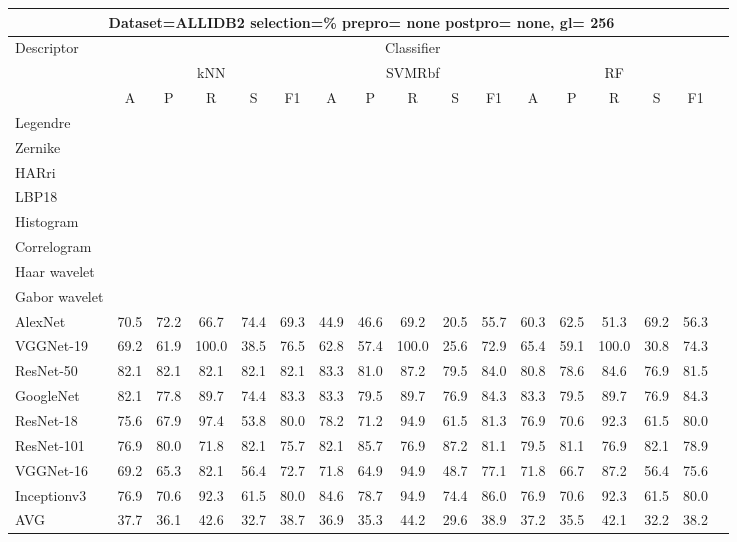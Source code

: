 \documentclass[12pt,italian]{article}
\begin{document}
\begin{tiny}
 \pagebreak 
\begin{longtable}{lcccccccccccccccc}
\toprule
\multicolumn{16}{c}{Dataset=ALLIDB2 selection=\% prepro= none postpro= none, gl= 256} \\ 
\toprule
Descriptor & \multicolumn{15}{c}{Classifier} \\ 
& \multicolumn{5}{c}{kNN} & \multicolumn{5}{c}{SVMRbf} & \multicolumn{5}{c}{RF} \\ 
& A & P & R & S & F1 & A & P & R & S & F1 & A & P & R & S & F1 \\ 
\midrule
Legendre \\ 
Zernike \\ 
HARri \\ 
LBP18 \\ 
Histogram \\ 
Correlogram \\ 
Haar wavelet \\ 
Gabor wavelet \\ 
AlexNet & 70.5 & 72.2 & 66.7 & 74.4 & 69.3 & 44.9 & 46.6 & 69.2 & 20.5 & 55.7 & 60.3 & 62.5 & 51.3 & 69.2 & 56.3 \\ 
VGGNet-19 & 69.2 & 61.9 & 100.0 & 38.5 & 76.5 & 62.8 & 57.4 & 100.0 & 25.6 & 72.9 & 65.4 & 59.1 & 100.0 & 30.8 & 74.3 \\ 
ResNet-50 & 82.1 & 82.1 & 82.1 & 82.1 & 82.1 & 83.3 & 81.0 & 87.2 & 79.5 & 84.0 & 80.8 & 78.6 & 84.6 & 76.9 & 81.5 \\ 
GoogleNet & 82.1 & 77.8 & 89.7 & 74.4 & 83.3 & 83.3 & 79.5 & 89.7 & 76.9 & 84.3 & 83.3 & 79.5 & 89.7 & 76.9 & 84.3 \\ 
ResNet-18 & 75.6 & 67.9 & 97.4 & 53.8 & 80.0 & 78.2 & 71.2 & 94.9 & 61.5 & 81.3 & 76.9 & 70.6 & 92.3 & 61.5 & 80.0 \\ 
ResNet-101 & 76.9 & 80.0 & 71.8 & 82.1 & 75.7 & 82.1 & 85.7 & 76.9 & 87.2 & 81.1 & 79.5 & 81.1 & 76.9 & 82.1 & 78.9 \\ 
VGGNet-16 & 69.2 & 65.3 & 82.1 & 56.4 & 72.7 & 71.8 & 64.9 & 94.9 & 48.7 & 77.1 & 71.8 & 66.7 & 87.2 & 56.4 & 75.6 \\ 
Inceptionv3 & 76.9 & 70.6 & 92.3 & 61.5 & 80.0 & 84.6 & 78.7 & 94.9 & 74.4 & 86.0 & 76.9 & 70.6 & 92.3 & 61.5 & 80.0 \\ 
\hline
AVG & 37.7 & 36.1 & 42.6 & 32.7 & 38.7 & 36.9 & 35.3 & 44.2 & 29.6 & 38.9 & 37.2 & 35.5 & 42.1 & 32.2 & 38.2 \\ 
\hline
\bottomrule
\end{longtable} 

 \pagebreak 
\end{tiny} 
 
\end{document}
